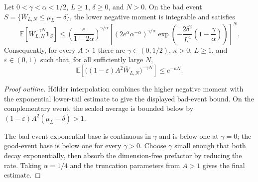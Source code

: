 \begin{lemma}
  \label{lem:gaussian-truncated-bad-event-moment}
  \leanok
  Let $0<\gamma<\alpha<1/2$, $L\ge1$, $\delta\ge0$, and $N>0$.
  On the bad event
  $S=\{\overline W_{L,N}\le\mu_L-\delta\}$, the lower negative moment is
  integrable and satisfies
  \[
    \mathbb E\!\left[
      \overline W_{L,N}^{-\gamma N}\mathbf 1_S
    \right]
    \le
    \left(\frac{e}{1-2\alpha}\right)^{\gamma/\alpha}
    \left[
      \left(2e^\alpha\alpha^{-\alpha}\right)^{\gamma/\alpha}
      \exp\!\left(
        -\frac{2\delta^2}{L^4}
        \left(1-\frac{\gamma}{\alpha}\right)
      \right)
    \right]^N.
  \]
  Consequently, for every $A>1$ there are
  $\gamma\in(0,1/2)$, $\kappa>0$, $L\ge1$, and
  $\varepsilon\in(0,1)$ such that, for all sufficiently large $N$,
  \[
    \mathbb E\!\left[
      \bigl((1-\varepsilon)A^2\overline W_{L,N}\bigr)^{-\gamma N}
    \right]
    \leq e^{-\kappa N}.
  \]
\end{lemma}
\begin{proof}[Proof outline]
  \leanok
  Hölder interpolation combines the higher negative moment with the
  exponential lower-tail estimate to give the displayed bad-event bound. On
  the complementary event, the scaled average is bounded below by
  $(1-\varepsilon)A^2(\mu_L-\delta)>1$.

  The bad-event exponential base is continuous in $\gamma$ and is below one
  at $\gamma=0$; the good-event base is below one for every $\gamma>0$.
  Choose $\gamma$ small enough that both decay exponentially, then absorb the
  dimension-free prefactor by reducing the rate. Taking $\alpha=1/4$ and the
  truncation parameters from $A>1$ gives the final estimate.
\end{proof}

